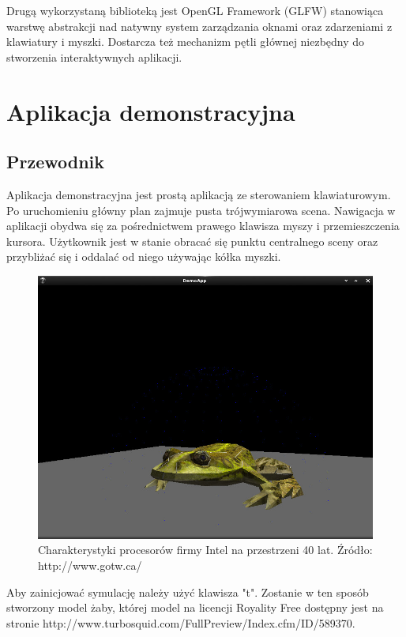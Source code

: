 Drugą wykorzystaną biblioteką jest OpenGL Framework (GLFW) stanowiąca warstwę
abstrakcji nad natywny system zarządzania oknami oraz zdarzeniami z klawiatury i
myszki. Dostarcza też mechanizm pętli głównej niezbędny do stworzenia
interaktywnych aplikacji.

\section{Aplikacja demonstracyjna}
\subsection{Przewodnik}
Aplikacja demonstracyjna jest prostą aplikacją ze sterowaniem klawiaturowym. Po
uruchomieniu główny plan zajmuje pusta trójwymiarowa scena. Nawigacja w
aplikacji obydwa się za pośrednictwem prawego klawisza myszy i przemieszczenia
kursora. Użytkownik jest w stanie obracać się punktu
centralnego sceny oraz przybliżać się i oddalać od niego używając kółka myszki.

\begin{figure}[H]
\centering
\includegraphics[scale=0.5]{images/z1.jpg}
\caption{Charakterystyki procesorów firmy Intel na przestrzeni 40 lat. Źródło: http://www.gotw.ca/}
\end{figure}

Aby zainicjować symulację należy użyć klawisza "t". Zostanie w ten sposób
stworzony model żaby, której model na licencji Royality Free
dostępny jest na stronie http://www.turbosquid.com/FullPreview/Index.cfm/ID/589370.

